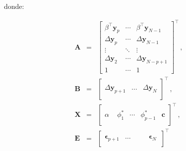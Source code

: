 \noindent donde:

\begin{eqnarray}\label{eq:vecmatrix}
 \mathbf{A}&=&
   \begin{bmatrix} 
   \beta^\top \mathbf{y}_{p} & 
   \cdots & \beta^\top \mathbf{y}_{N-1} \\
   \Delta \mathbf{y}_p  & \cdots 
   &\Delta\mathbf{y}_{N-1} \\ 
   \vdots  & \ddots & \vdots \\
   \Delta\mathbf{y}_2  & \cdots 
   & \Delta \mathbf{y}_{N-p+1} \\
   1 & \cdots & 1 
   \end{bmatrix}^\top \label{eq:vecA} \, ,\\
\mathbf{B} & = &
 \begin{bmatrix}
 \quad\\
  \Delta \mathbf{y}_{p+1} & 
  \dots &
  \Delta \mathbf{y}_N \label{eq:vecB}\\
  \quad
 \end{bmatrix}^\top \, ,\\
\mathbf{X}&=&
  \begin{bmatrix}
   \quad \\
   \alpha & \phi_1^* & \cdots & \phi_{p-1}^* & \mathbf{c} \\  
   \quad
   \end{bmatrix}^\top \, ,\\
\mathbf{E} &=&
\begin{bmatrix}
   \quad \\
   \mathbf{\epsilon}_{p+1} &
   \dots &
   \quad &\mathbf{\epsilon}_N \, \\ \quad
\end{bmatrix}^\top 
\end{eqnarray}

